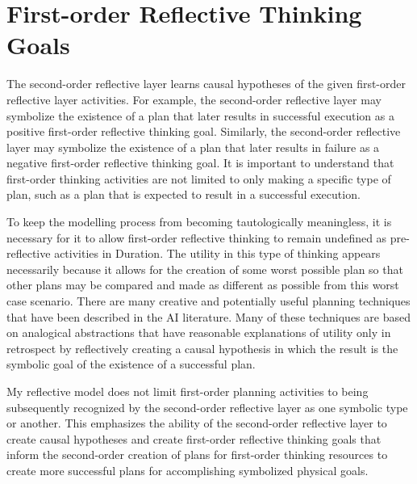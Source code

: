 \section{First-order Reflective Thinking Goals}

The second-order reflective layer learns causal hypotheses of the
given first-order reflective layer activities.  For example, the
second-order reflective layer may symbolize the existence of a plan
that later results in successful execution as a positive first-order
reflective thinking goal.  Similarly, the second-order reflective
layer may symbolize the existence of a plan that later results in
failure as a negative first-order reflective thinking goal.  It is
important to understand that first-order thinking activities are not
limited to only making a specific type of plan, such as a plan that is
expected to result in a successful execution.

To keep the modelling process from becoming tautologically
meaningless, it is necessary for it to allow first-order reflective
thinking to remain undefined as pre-reflective activities in Duration.
The utility in this type of thinking appears necessarily because it
allows for the creation of some worst possible plan so that other
plans may be compared and made as different as possible from this
worst case scenario.  There are many creative and potentially useful
planning techniques that have been described in the AI literature.
Many of these techniques are based on analogical abstractions that
have reasonable explanations of utility only in retrospect by
reflectively creating a causal hypothesis in which the result is the
symbolic goal of the existence of a successful plan.

My reflective model does not limit first-order planning activities to
being subsequently recognized by the second-order reflective layer as
one symbolic type or another.  This emphasizes the ability of the
second-order reflective layer to create causal hypotheses and create
first-order reflective thinking goals that inform the second-order
creation of plans for first-order thinking resources to create more
successful plans for accomplishing symbolized physical goals.

